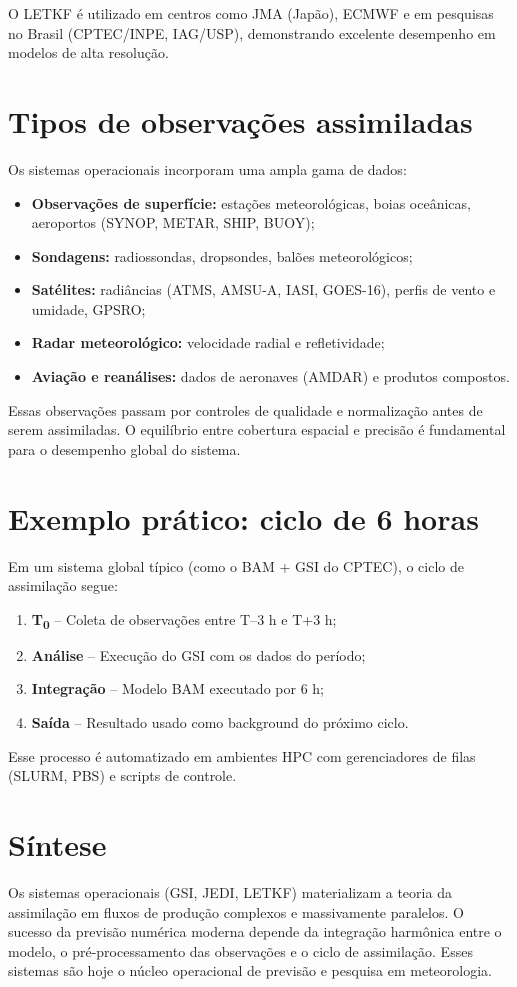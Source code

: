 O LETKF é utilizado em centros como JMA (Japão), ECMWF e em pesquisas no Brasil (CPTEC/INPE, IAG/USP), demonstrando excelente desempenho em modelos de alta resolução.

\section{Tipos de observações assimiladas}
Os sistemas operacionais incorporam uma ampla gama de dados:
\begin{itemize}
  \item \textbf{Observações de superfície:} estações meteorológicas, boias oceânicas, aeroportos (SYNOP, METAR, SHIP, BUOY);
  \item \textbf{Sondagens:} radiossondas, dropsondes, balões meteorológicos;
  \item \textbf{Satélites:} radiâncias (ATMS, AMSU-A, IASI, GOES-16), perfis de vento e umidade, GPSRO;
  \item \textbf{Radar meteorológico:} velocidade radial e refletividade;
  \item \textbf{Aviação e reanálises:} dados de aeronaves (AMDAR) e produtos compostos.
\end{itemize}
Essas observações passam por controles de qualidade e normalização antes de serem assimiladas.
O equilíbrio entre cobertura espacial e precisão é fundamental para o desempenho global do sistema.

\section{Exemplo prático: ciclo de 6 horas}
Em um sistema global típico (como o BAM + GSI do CPTEC), o ciclo de assimilação segue:
\begin{enumerate}
  \item \textbf{T\textsubscript{0}} – Coleta de observações entre T–3 h e T+3 h;
  \item \textbf{Análise} – Execução do GSI com os dados do período;
  \item \textbf{Integração} – Modelo BAM executado por 6 h;
  \item \textbf{Saída} – Resultado usado como background do próximo ciclo.
\end{enumerate}
Esse processo é automatizado em ambientes HPC com gerenciadores de filas (SLURM, PBS) e scripts de controle.

\section{Síntese}
Os sistemas operacionais (GSI, JEDI, LETKF) materializam a teoria da assimilação em fluxos de produção complexos e massivamente paralelos.
O sucesso da previsão numérica moderna depende da integração harmônica entre o modelo, o pré-processamento das observações e o ciclo de assimilação.
Esses sistemas são hoje o núcleo operacional de previsão e pesquisa em meteorologia.

